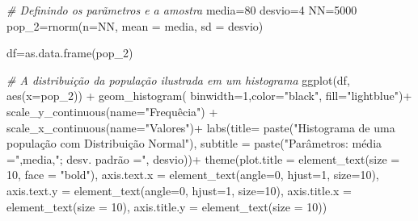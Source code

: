\documentclass[
]{book}
\newenvironment{Shaded}{\begin{snugshade}}{\end{snugshade}}
\newcommand{\AttributeTok}[1]{\textcolor[rgb]{0.77,0.63,0.00}{#1}}
\newcommand{\CommentTok}[1]{\textcolor[rgb]{0.56,0.35,0.01}{\textit{#1}}}
\newcommand{\DecValTok}[1]{\textcolor[rgb]{0.00,0.00,0.81}{#1}}
\newcommand{\FunctionTok}[1]{\textcolor[rgb]{0.00,0.00,0.00}{#1}}
\newcommand{\NormalTok}[1]{#1}
\newcommand{\OtherTok}[1]{\textcolor[rgb]{0.56,0.35,0.01}{#1}}
\newcommand{\SpecialCharTok}[1]{\textcolor[rgb]{0.00,0.00,0.00}{#1}}
\newcommand{\StringTok}[1]{\textcolor[rgb]{0.31,0.60,0.02}{#1}}
\begin{document}
\hfill\break

\begin{Shaded}
\begin{Highlighting}[]
\CommentTok{\# Definindo os parãmetros e a amostra}
\NormalTok{media}\OtherTok{=}\DecValTok{80}
\NormalTok{desvio}\OtherTok{=}\DecValTok{4}
\NormalTok{NN}\OtherTok{=}\DecValTok{5000}
\NormalTok{pop\_2}\OtherTok{=}\FunctionTok{rnorm}\NormalTok{(}\AttributeTok{n=}\NormalTok{NN, }\AttributeTok{mean =}\NormalTok{ media, }\AttributeTok{sd =}\NormalTok{ desvio)}

\NormalTok{df}\OtherTok{=}\FunctionTok{as.data.frame}\NormalTok{(pop\_2)}

\CommentTok{\# A distribuição da população ilustrada em um histograma}
\FunctionTok{ggplot}\NormalTok{(df, }\FunctionTok{aes}\NormalTok{(}\AttributeTok{x=}\NormalTok{pop\_2)) }\SpecialCharTok{+} 
  \FunctionTok{geom\_histogram}\NormalTok{( }\AttributeTok{binwidth=}\DecValTok{1}\NormalTok{,}\AttributeTok{color=}\StringTok{"black"}\NormalTok{, }\AttributeTok{fill=}\StringTok{"lightblue"}\NormalTok{)}\SpecialCharTok{+}
  \FunctionTok{scale\_y\_continuous}\NormalTok{(}\AttributeTok{name=}\StringTok{"Frequêcia"}\NormalTok{) }\SpecialCharTok{+}
  \FunctionTok{scale\_x\_continuous}\NormalTok{(}\AttributeTok{name=}\StringTok{"Valores"}\NormalTok{)}\SpecialCharTok{+}
  \FunctionTok{labs}\NormalTok{(}\AttributeTok{title=} \FunctionTok{paste}\NormalTok{(}\StringTok{"Histograma de uma população com Distribuição Normal"}\NormalTok{), }
       \AttributeTok{subtitle =} \FunctionTok{paste}\NormalTok{(}\StringTok{"Parâmetros: média ="}\NormalTok{,media,}\StringTok{"; desv. padrão ="}\NormalTok{, desvio))}\SpecialCharTok{+}
  \FunctionTok{theme}\NormalTok{(}\AttributeTok{plot.title =} \FunctionTok{element\_text}\NormalTok{(}\AttributeTok{size =} \DecValTok{10}\NormalTok{, }\AttributeTok{face =} \StringTok{"bold"}\NormalTok{),}
        \AttributeTok{axis.text.x =} \FunctionTok{element\_text}\NormalTok{(}\AttributeTok{angle=}\DecValTok{0}\NormalTok{, }\AttributeTok{hjust=}\DecValTok{1}\NormalTok{, }\AttributeTok{size=}\DecValTok{10}\NormalTok{),}
        \AttributeTok{axis.text.y =} \FunctionTok{element\_text}\NormalTok{(}\AttributeTok{angle=}\DecValTok{0}\NormalTok{, }\AttributeTok{hjust=}\DecValTok{1}\NormalTok{, }\AttributeTok{size=}\DecValTok{10}\NormalTok{),}
        \AttributeTok{axis.title.x =} \FunctionTok{element\_text}\NormalTok{(}\AttributeTok{size =} \DecValTok{10}\NormalTok{),}
        \AttributeTok{axis.title.y =} \FunctionTok{element\_text}\NormalTok{(}\AttributeTok{size =} \DecValTok{10}\NormalTok{))}
\end{Highlighting}
\end{Shaded}
\end{document}
